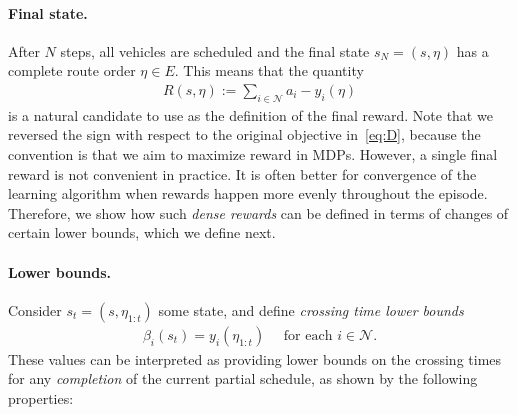 \documentclass[a4paper]{report}
\theoremstyle{definition}
\theoremstyle{plain}
\begin{document}


\paragraph{Final state.}
After $N$ steps, all vehicles are scheduled and the final state $s_N = (s, \eta)$ has a complete route order $\eta \in E$.
%
This means that the quantity
\begin{align}
  R(s, \eta) := \sum_{i \in \mathcal{N}} a_i - y_i(\eta)
\end{align}
is a natural candidate to use as the definition of the final reward. Note that
we reversed the sign with respect to the original objective in~\eqref{eq:D}, because the
convention is that we aim to maximize reward in MDPs.
%
However, a single final reward is not convenient in practice. It is often better
for convergence of the learning algorithm when rewards happen more evenly
throughout the episode.
%
Therefore, we show how such \emph{dense rewards} can be defined in terms of changes of
certain lower bounds, which we define next.


\paragraph{Lower bounds.}
Consider $s_t = (s, \eta_{1:t})$ some state, and define \emph{crossing time lower
  bounds}
\begin{align}
  \beta_i(s_t) = y_i(\eta_{1:t}) \quad \text{ for each } i \in \mathcal{N} .
\end{align}
%
These values can be interpreted as providing lower bounds on the crossing times
for any \emph{completion} of the current partial schedule, as shown by the following
properties:
\end{document}
